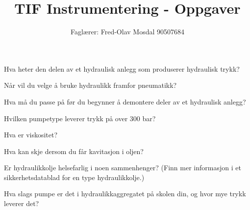 \documentclass[12pt,a4paper]{article}
\def\oppgave{
		}
\begin{document}
\title{TIF Instrumentering - Oppgaver}
\author{Faglærer: Fred-Olav Mosdal 90507684\\}
\maketitle
\oppgave{}%
\vskip 2.5pt 
Hva heter den delen av et hydraulisk anlegg som produserer hydraulisk trykk?
\vskip 5pt 
\vskip 2.5pt 
\oppgave{}%
\vskip 2.5pt 
Når vil du velge å bruke hydraulikk framfor pneumatikk?
\vskip 5pt 
\vskip 2.5pt 
\oppgave{}%
\vskip 2.5pt 
Hva må du passe på før du begynner å demontere deler av et hydraulisk anlegg?
\vskip 5pt 
\vskip 2.5pt 
\oppgave{}%
\vskip 2.5pt 
Hvilken pumpetype leverer trykk på over 300 bar?
\vskip 5pt 
\vskip 2.5pt 
\oppgave{}%
\vskip 2.5pt 
Hva er viskositet?
\vskip 5pt 
\vskip 2.5pt 
\oppgave{}%
\vskip 2.5pt 
Hva kan skje dersom du får kavitasjon i oljen?
\vskip 5pt 
\vskip 2.5pt 
\oppgave{}%
\vskip 2.5pt 
Er hydraulikkolje helsefarlig i noen sammenhenger? (Finn mer informasjon i et sikkerhetsdatablad for en type hydraulikkolje.)
\vskip 5pt 
\vskip 2.5pt 
\oppgave{}%
\vskip 2.5pt 
Hva slags pumpe er det i hydraulikkaggregatet på skolen din, og hvor mye trykk leverer det?
\vskip 5pt 
\end{document}
